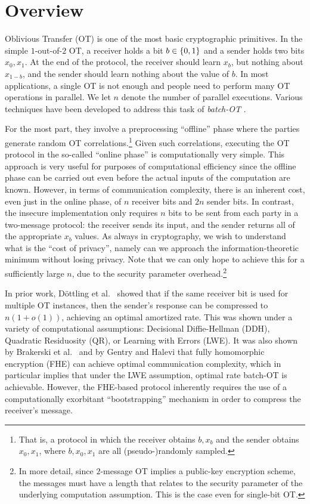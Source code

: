 \section{Overview}
\label{sec:overview-r1ot}
Oblivious Transfer (OT) \cite{RabinOT,C:EveGolLem82} is one of the most basic cryptographic primitives. In the simple $1$-out-of-$2$ OT, a receiver holds a bit $b \in \{0,1\}$ and a sender holds two bits $x_0, x_1$. At the end of the protocol, the receiver should learn $x_b$, but nothing about $x_{1-b}$, and the sender should learn nothing about the value of $b$. In most applications, a single OT is not enough and people need to perform many OT operations in parallel. We let $n$ denote the number of parallel executions. Various techniques have been developed to address this task of \emph{batch-OT} \cite{C:IKNP03,C:BCGIKS19,CCS:BCGIKRS19}.

For the most part, they involve a preprocessing ``offline'' phase where the parties generate random OT correlations.\footnote{That is, a protocol in which the receiver obtains $b, x_b$ and the sender obtains $x_0,x_1$, where $b, x_0, x_1$ are all (pseudo-)randomly sampled.} Given such correlations, executing the OT protocol in the so-called ``online phase'' is computationally very simple. This approach is very useful for purposes of computational efficiency since the offline phase can be carried out even before the actual inputs of the computation are known. However, in terms of communication complexity, there is an inherent cost, even just in the online phase, of $n$ receiver bits and $2n$ sender bits. In contrast, the insecure implementation only requires $n$ bits to be sent from each party in a two-message protocol: the receiver sends its input, and the sender returns all of the appropriate $x_b$ values. As always in cryptography, we wish to understand what is the ``cost of privacy'', namely can we approach the information-theoretic minimum without losing privacy. Note that we can only hope to achieve this for a sufficiently large $n$, due to the security parameter overhead.\footnote{In more detail, since $2$-message OT implies a public-key encryption scheme, the messages must have a length that relates to the security parameter of the underlying computation assumption. This is the case even for single-bit OT.}

In prior work, D\"{o}ttling et al.~\cite{C:DGIMMO19} showed that if the same receiver bit is used for multiple OT instances, then the sender's response can be compressed to $n(1+o(1))$, achieving an optimal amortized rate. This was shown under a variety of computational assumptions: Decisional Diffie-Hellman (DDH), Quadratic Residuosity (QR), or Learning with Errors (LWE). It was also shown by Brakerski et al.~\cite{TCC:BDGM19} and by Gentry and Halevi \cite{TCC:GenHal19} that fully homomorphic encryption (FHE) can achieve optimal communication complexity, which in particular implies that under the LWE assumption, optimal rate batch-OT is achievable. However, the FHE-based protocol inherently requires the use of a computationally exorbitant ``bootstrapping'' mechanism in order to compress the receiver's message.



